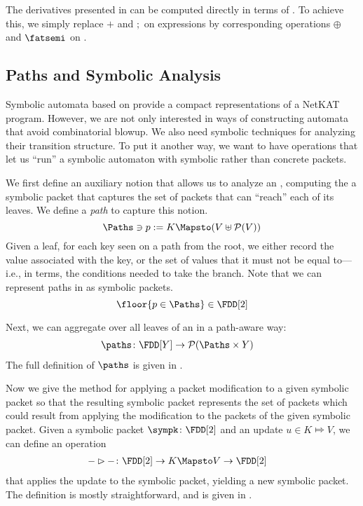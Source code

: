 \begin{remark}
The derivatives presented in  can be computed
directly in terms of \FDDs. To achieve this, we simply replace $+$ and
$;$ on expressions by corresponding operations $\oplus$ and $\fatsemi$
on \FDDs.
\end{remark}

\subsection{Paths and Symbolic Analysis}

Symbolic automata based on \FDDs provide a compact representations of
a NetKAT program. However, we are not only interested in ways of
constructing automata that avoid combinatorial blowup. We also need
symbolic techniques for analyzing their transition structure. To put
it another way, we want to have operations that let us ``run'' a
symbolic automaton with symbolic rather than concrete packets.

We first define an auxiliary notion that allows us to analyze an
\FDD{}, computing the a symbolic packet that captures the set of
packets that can ``reach'' each of its leaves. We define a \emph{path}
to capture this notion.
%
\[\Paths \ni p := K \Mapsto (V \uplus \mathcal{P}(V))\]
%
Given a leaf, for each key seen on a path from the root, we either
record the value associated with the key, or the set of values that it
must not be equal to---i.e., in \FDD{} terms, the conditions needed to
take the \false branch. Note that we can represent paths in \FDD[2] as
symbolic packets.
%
\[\floor{p\in\Paths} \in \FDD[2] \]
%

Next, we can aggregate over all leaves of an \FDD{} in a path-aware
way:
\begin{align*}
    &\paths\colon \FDD[Y] \to \mathcal{P}(\Paths \times Y)
\end{align*}
The full definition of $\paths$ is given in .

Now we give the method for applying a packet modification to a given
symbolic packet so that the resulting symbolic packet represents the
set of packets which could result from applying the modification to
the packets of the given symbolic packet.
%
Given a symbolic packet $\sympk\colon \FDD[2]$ and an update $u \in
K\Mapsto V$, we can define an operation
\begin{align*}
    - &\rhd - \colon \FDD[2] \to K \Mapsto V \to \FDD[2]
\end{align*}
that applies the update to the symbolic packet, yielding a new
symbolic packet. The definition is mostly straightforward, and is
given in .

